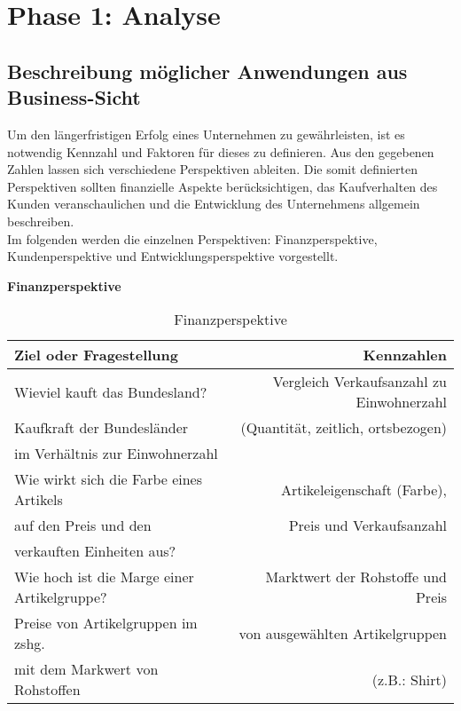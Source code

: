 \section{Phase 1: Analyse}

\subsection{Beschreibung möglicher Anwendungen aus Business-Sicht}
\label{ref:businessSicht}

Um den längerfristigen Erfolg eines Unternehmen zu gewährleisten, ist es notwendig Kennzahl und Faktoren für dieses zu definieren. 
Aus den gegebenen Zahlen lassen sich verschiedene Perspektiven ableiten. 
Die somit definierten Perspektiven sollten finanzielle Aspekte berücksichtigen, das Kaufverhalten des Kunden veranschaulichen und die Entwicklung des Unternehmens allgemein beschreiben.\\
Im folgenden werden die einzelnen Perspektiven: Finanzperspektive, Kundenperspektive und Entwicklungsperspektive vorgestellt.

\begin{table}[htbp]
\textbf{Finanzperspektive}
\begin{center}
  \begin{tabular}{ | l | r | }
    \hline
    \textbf{Ziel oder Fragestellung} & \textbf{Kennzahlen} \\ \hline
	Wieviel kauft das Bundesland? & Vergleich Verkaufsanzahl zu Einwohnerzahl\\     
     Kaufkraft der Bundesländer & (Quantität, zeitlich, ortsbezogen) \\  im Verhältnis zur Einwohnerzahl &  \\ \hline
    Wie wirkt sich die Farbe eines Artikels & Artikeleigenschaft (Farbe),  \\ auf den Preis und den & Preis und Verkaufsanzahl \\   verkauften Einheiten aus? &  \\ \hline
    Wie hoch ist die Marge einer Artikelgruppe? & Marktwert der Rohstoffe und Preis \\Preise von Artikelgruppen im zshg. & von ausgewählten Artikelgruppen  \\  mit dem Markwert von Rohstoffen & (z.B.: Shirt)\\ \hline
  \end{tabular}
\end{center}
\caption{Finanzperspektive}
\label{table:tableFinanz}
\end{table}

